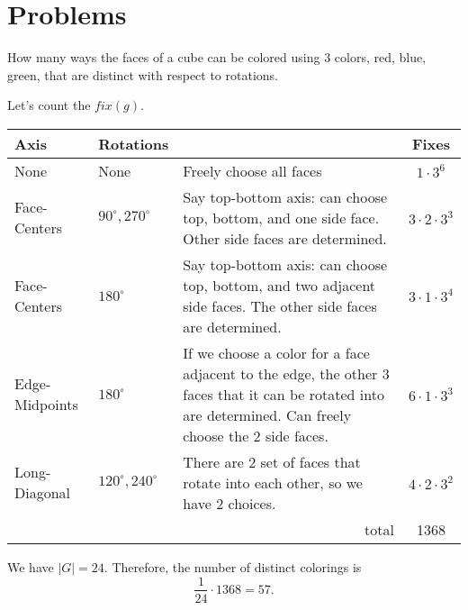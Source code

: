 \documentclass[11pt,twoside]{scrartcl}
\begin{document}
\section{Problems}
\begin{problem}
    How many ways the faces of a cube can be colored using 3 colors, red, blue, green, that are distinct with respect to rotations.

    \begin{sketch}
        Let's count the $fix(g)$.
        \begin{center}
            \begin{tabular}{|l|l|p{5cm}|c|}
                \hline
                Axis & Rotations &  & Fixes \\
                \hline
                None & None & Freely choose all faces & $1 \cdot 3^6$ \\
                \hline
                Face-Centers & $90^\circ, 270^\circ$ & Say top-bottom axis: can choose top, bottom, and one side face. Other side faces are determined. & $3 \cdot 2 \cdot 3^3$ \\
                \hline
                Face-Centers & $180^\circ$ & Say top-bottom axis: can choose top, bottom, and two adjacent side faces. The other side faces are determined. & $3 \cdot 1 \cdot 3^4$ \\
                \hline
                Edge-Midpoints & $180^\circ$ & If we choose a color for a face adjacent to the edge, the other 3 faces that it can be rotated into are determined. Can freely choose the 2 side faces. & $6 \cdot 1 \cdot 3^3$ \\
                \hline
                Long-Diagonal & $120^\circ, 240^\circ$ & There are 2 set of faces that rotate into each other, so we have 2 choices. & $4 \cdot 2 \cdot 3^2$ \\
                \hline
                \multicolumn{3}{|r|}{total} & 1368 \\
                \hline
            \end{tabular}
        \end{center}
        We have $|G| = 24$. Therefore, the number of distinct colorings is
        \[\frac{1}{24} \cdot 1368 = \boxed{57}.\]
    \end{sketch}
\end{problem}
\end{document}
